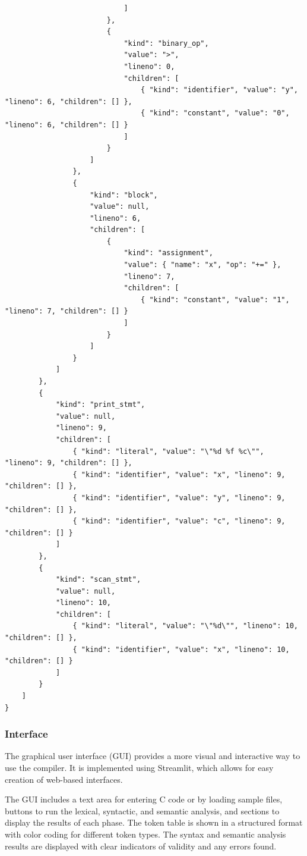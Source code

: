 \documentclass[letterpaper,12pt,oneside]{article}
\begin{document}
\begin{lstlisting}
                            ]
                        },
                        {
                            "kind": "binary_op",
                            "value": ">",
                            "lineno": 0,
                            "children": [
                                { "kind": "identifier", "value": "y", "lineno": 6, "children": [] },
                                { "kind": "constant", "value": "0", "lineno": 6, "children": [] }
                            ]
                        }
                    ]
                },
                {
                    "kind": "block",
                    "value": null,
                    "lineno": 6,
                    "children": [
                        {
                            "kind": "assignment",
                            "value": { "name": "x", "op": "+=" },
                            "lineno": 7,
                            "children": [
                                { "kind": "constant", "value": "1", "lineno": 7, "children": [] }
                            ]
                        }
                    ]
                }
            ]
        },
        {
            "kind": "print_stmt",
            "value": null,
            "lineno": 9,
            "children": [
                { "kind": "literal", "value": "\"%d %f %c\"", "lineno": 9, "children": [] },
                { "kind": "identifier", "value": "x", "lineno": 9, "children": [] },
                { "kind": "identifier", "value": "y", "lineno": 9, "children": [] },
                { "kind": "identifier", "value": "c", "lineno": 9, "children": [] }
            ]
        },
        {
            "kind": "scan_stmt",
            "value": null,
            "lineno": 10,
            "children": [
                { "kind": "literal", "value": "\"%d\"", "lineno": 10, "children": [] },
                { "kind": "identifier", "value": "x", "lineno": 10, "children": [] }
            ]
        }
    ]
}
\end{lstlisting}

\newpage

\subsubsection{ Interface}
The graphical user interface (GUI) provides a more visual and interactive way to use the compiler. It is implemented using Streamlit, which allows for easy creation of web-based interfaces.

The GUI includes a text area for entering C code or by loading sample files, buttons to run the lexical, syntactic, and semantic analysis, and sections to display the results of each phase. The token table is shown in a structured format with color coding for different token types. The syntax and semantic analysis results are displayed with clear indicators of validity and any errors found.
\end{document}
